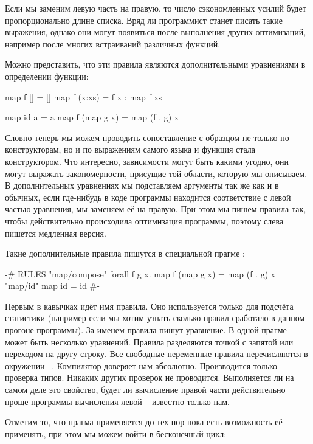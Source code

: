 Если мы заменим левую часть на правую, то число сэкономленных
усилий будет пропорционально длине списка. Вряд ли программист
станет писать такие выражения, однако они могут появиться
после выполнения других оптимизаций, например после многих
встраиваний различных функций.

Можно представить, что эти правила являются дополнительными
уравнениями в определении функции:

\begin{code}
map f []        = []
map f (x:xs)    = f x : map f xs

map id a        = a
map f (map g x) = map (f . g) x
\end{code}
  
Словно теперь мы можем проводить сопоставление 
с образцом не только по конструкторам, но и по 
выражениям самого языка и функция 
стала конструктором. Что интересно, зависимости 
могут быть какими угодно, они могут выражать 
закономерности, присущие той области, которую мы 
описываем. В дополнительных уравнениях мы подставляем
аргументы так же как и в обычных, если где-нибудь
в коде программы находится соответствие с левой частью
уравнения, мы заменяем её на правую. При этом мы 
пишем правила так, чтобы действительно происходила
оптимизация программы, поэтому слева пишется 
медленная версия. 

Такие дополнительные правила пишутся в специальной
прагме :

\begin{code}
{-# RULES
    "map/compose"   forall f g x.  map f (map g x)  = map (f . g) x    
    "map/id"                       map id           = id 
#-}
\end{code}
  
Первым в кавычках идёт имя правила. Оно используется только для
подсчёта статистики (например если мы хотим узнать сколько
правил сработало в данном прогоне программы). За именем правила
пишут уравнение. В одной прагме может быть несколько уравнений.
Правила разделяются точкой с запятой или переходом на другу строку.
Все свободные переменные правила перечисляются в окружении
~. Компилятор доверяет нам абсолютно.
Производится только проверка типов. Никаких других проверок
не проводится. Выполняется ли на самом деле это свойство,
будет ли вычисление правой части действительно проще программы 
вычисления левой -- известно только нам. 

Отметим то, что прагма  применяется до тех 
пор пока есть возможность её применять, при этом мы можем
войти в бесконечный цикл:

